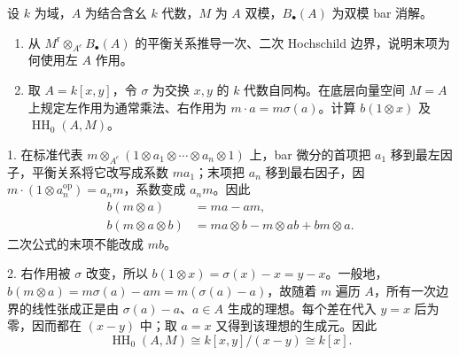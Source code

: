 \begin{optionalexercise}\label{b4:ex:12-bar-twisted-coefficients}
	设 \(k\) 为域，\(A\) 为结合含幺 \(k\) 代数，\(M\) 为 \(A\) 双模，\(B_\bullet(A)\) 为双模 bar 消解。
	\begin{enumerate}
		\item 从 \(M^{\mathrm r}\otimes_{A^e}B_\bullet(A)\) 的平衡关系推导一次、二次 Hochschild 边界，说明末项为何使用左 \(A\) 作用。
		\item 取 \(A=k[x,y]\)，令 \(\sigma\) 为交换 \(x,y\) 的 \(k\) 代数自同构。在底层向量空间 \(M=A\) 上规定左作用为通常乘法、右作用为 \(m\cdot a=m\sigma(a)\)。计算 \(b(1\otimes x)\) 及 \(\operatorname{HH}_0(A,M)\)。
	\end{enumerate}
\end{optionalexercise}
\begin{solution}
	1. 在标准代表 \(m\otimes_{A^e}(1\otimes a_1\otimes\cdots\otimes a_n\otimes1)\) 上，bar 微分的首项把 \(a_1\) 移到最左因子，平衡关系将它改写成系数 \(ma_1\)；末项把 \(a_n\) 移到最右因子，因 \(m\cdot(1\otimes a_n^{\mathrm{op}})=a_nm\)，系数变成 \(a_nm\)。因此
	\[
		\begin{aligned}
			b(m\otimes a)&=ma-am,\\
			b(m\otimes a\otimes b)&=ma\otimes b-m\otimes ab+bm\otimes a.
		\end{aligned}
	\]
	二次公式的末项不能改成 \(mb\)。

	2. 右作用被 \(\sigma\) 改变，所以 \(b(1\otimes x)=\sigma(x)-x=y-x\)。一般地，\(b(m\otimes a)=m\sigma(a)-am=m(\sigma(a)-a)\)，故随着 \(m\) 遍历 \(A\)，所有一次边界的线性张成正是由 \(\sigma(a)-a\)、\(a\in A\) 生成的理想。每个差在代入 \(y=x\) 后为零，因而都在 \((x-y)\) 中；取 \(a=x\) 又得到该理想的生成元。因此
	\[
		\operatorname{HH}_0(A,M)\cong k[x,y]/(x-y)\cong k[x].
	\]
\end{solution}

